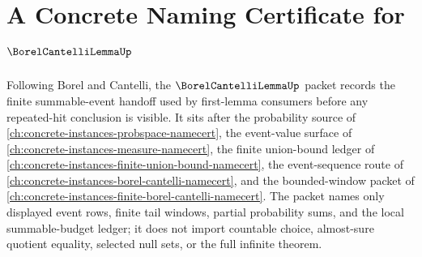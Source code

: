 \chapter{A Concrete Naming Certificate for $\BorelCantelliLemmaUp$}
\label{ch:concrete-instances-borel-cantelli-lemma-namecert}

Following Borel and Cantelli, the $\BorelCantelliLemmaUp$ packet records the finite summable-event handoff used by first-lemma consumers before any repeated-hit conclusion is visible. It sits after the probability source of \autoref{ch:concrete-instances-probspace-namecert}, the event-value surface of \autoref{ch:concrete-instances-measure-namecert}, the finite union-bound ledger of \autoref{ch:concrete-instances-finite-union-bound-namecert}, the event-sequence route of \autoref{ch:concrete-instances-borel-cantelli-namecert}, and the bounded-window packet of \autoref{ch:concrete-instances-finite-borel-cantelli-namecert}. The packet names only displayed event rows, finite tail windows, partial probability sums, and the local summable-budget ledger; it does not import countable choice, almost-sure quotient equality, selected null sets, or the full infinite theorem.

